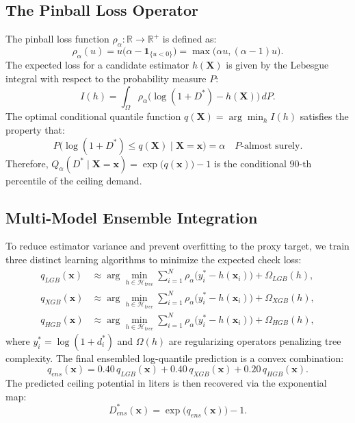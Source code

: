 \documentclass[11pt,a4paper]{article}
\theoremstyle{definition}
\begin{document}
\subsection{The Pinball Loss Operator}
The pinball loss function $\rho_\alpha : \mathbb{R} \to \mathbb{R}^+$ is defined as:
\begin{equation}
    \rho_\alpha(u) = u \big(\alpha - \bm{1}_{\{u < 0\}}\big) = \max\big(\alpha u, (\alpha - 1)u\big).
\end{equation}
The expected loss for a candidate estimator $h(\bm{X})$ is given by the Lebesgue integral with respect to the probability measure $P$:
\begin{equation}
    I(h) = \int_\Omega \rho_\alpha\big(\log(1 + D^*) - h(\bm{X})\big) \, dP.
\end{equation}
The optimal conditional quantile function $q(\bm{X}) = \arg\min_{h} I(h)$ satisfies the property that:
\begin{equation}
    P\big(\log(1 + D^*) \le q(\bm{X}) \mid \bm{X} = \bm{x}\big) = \alpha \quad P\text{-almost surely}.
\end{equation}
Therefore, $Q_{\alpha}(D^* \mid \bm{X} = \bm{x}) = \exp\big(q(\bm{x})\big) - 1$ is the conditional $90\text{-th}$ percentile of the ceiling demand.

\subsection{Multi-Model Ensemble Integration}
To reduce estimator variance and prevent overfitting to the proxy target, we train three distinct learning algorithms to minimize the expected check loss:
\begin{align}
    q_{LGB}(\bm{x}) &\approx \arg\min_{h \in \mathcal{H}_{tree}} \sum_{i=1}^N \rho_\alpha\big(y_i^* - h(\bm{x}_i)\big) + \Omega_{LGB}(h), \\
    q_{XGB}(\bm{x}) &\approx \arg\min_{h \in \mathcal{H}_{tree}} \sum_{i=1}^N \rho_\alpha\big(y_i^* - h(\bm{x}_i)\big) + \Omega_{XGB}(h), \\
    q_{HGB}(\bm{x}) &\approx \arg\min_{h \in \mathcal{H}_{tree}} \sum_{i=1}^N \rho_\alpha\big(y_i^* - h(\bm{x}_i)\big) + \Omega_{HGB}(h),
\end{align}
where $y_i^* = \log(1 + d_i^*)$ and $\Omega(h)$ are regularizing operators penalizing tree complexity. The final ensembled log-quantile prediction is a convex combination:
\begin{equation}
    q_{ens}(\bm{x}) = 0.40 \, q_{LGB}(\bm{x}) + 0.40 \, q_{XGB}(\bm{x}) + 0.20 \, q_{HGB}(\bm{x}).
\end{equation}
The predicted ceiling potential in liters is then recovered via the exponential map:
\begin{equation}
    D_{ens}^*(\bm{x}) = \exp\big(q_{ens}(\bm{x})\big) - 1.
\end{equation}
\end{document}
